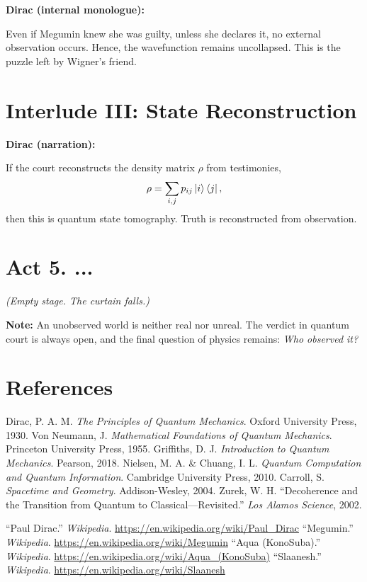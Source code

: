\documentclass[12pt]{article}
\begin{document}
\textbf{Dirac (internal monologue):}

Even if Megumin knew she was guilty, unless she declares it, no external observation occurs. Hence, the wavefunction remains uncollapsed. This is the puzzle left by Wigner's friend.

\section*{Interlude III: State Reconstruction}

\textbf{Dirac (narration):}

If the court reconstructs the density matrix $\rho$ from testimonies,
\[
\rho = \sum_{i,j} p_{ij} \ket{i}\bra{j},
\]
then this is quantum state tomography. Truth is reconstructed from observation.

\section*{Act 5. ...}

\textit{(Empty stage. The curtain falls.)}

\textbf{Note:} An unobserved world is neither real nor unreal. The verdict in quantum court is always open, and the final question of physics remains: \emph{Who observed it?}

\newpage
\section*{References}
\begin{thebibliography}{10}
 Dirac, P. A. M. \textit{The Principles of Quantum Mechanics}. Oxford University Press, 1930.
 Von Neumann, J. \textit{Mathematical Foundations of Quantum Mechanics}. Princeton University Press, 1955.
 Griffiths, D. J. \textit{Introduction to Quantum Mechanics}. Pearson, 2018.
 Nielsen, M. A. \& Chuang, I. L. \textit{Quantum Computation and Quantum Information}. Cambridge University Press, 2010.
 Carroll, S. \textit{Spacetime and Geometry}. Addison-Wesley, 2004.
 Zurek, W. H. ``Decoherence and the Transition from Quantum to Classical---Revisited.'' \textit{Los Alamos Science}, 2002.
 \raggedright ``Paul Dirac.'' \textit{Wikipedia}. \url{https://en.wikipedia.org/wiki/Paul_Dirac}
 ``Megumin.'' \textit{Wikipedia}. \url{https://en.wikipedia.org/wiki/Megumin}
 ``Aqua (KonoSuba).'' \textit{Wikipedia}. \url{https://en.wikipedia.org/wiki/Aqua_(KonoSuba)}
 ``Slaanesh.'' \textit{Wikipedia}. \url{https://en.wikipedia.org/wiki/Slaanesh}
\end{thebibliography}
\end{document}
